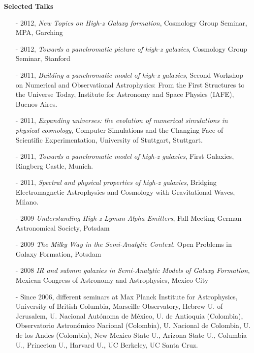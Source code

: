 \documentclass[9pt]{article}
\begin{document}
{\bf Selected Talks}
\begin{itemize} 
\item [-] 2012, {\it New Topics on High-z Galaxy formation}, Cosmology Group Seminar, MPA, Garching
\item [-] 2012, {\it Towards a panchromatic picture of high-z galaxies}, Cosmology Group Seminar, Stanford
\item [-] 2011, {\it Building a panchromatic model of high-z galaxies}, Second Workshop on Numerical and Observational Astrophysics: From the First Structures to the Universe Today, Institute for Astronomy and Space Physics (IAFE), Buenos Aires.
\item [-] 2011, {\it Expanding universes: the evolution of numerical simulations in physical cosmology}, Computer Simulations and the Changing Face of Scientific Experimentation, University of Stuttgart, Stuttgart.
\item [-] 2011, {\it Towards a panchromatic model of high-z galaxies}, First
  Galaxies, Ringberg Castle, Munich. 
\item [-] 2011, {\it Spectral and physical properties of high-z galaxies},
  Bridging Electromagnetic Astrophysics and Cosmology with Gravitational
  Waves, Milano.
\item [-] 2009 {\it Understanding High-z Lyman Alpha Emitters}, Fall Meeting German Astronomical Society, Potsdam
\item [-] 2009 {\it The Milky Way in the Semi-Analytic Context}, Open Problems in Galaxy Formation, Potsdam
\item [-] 2008 {\it IR and submm galaxies in Semi-Analytic Models of Galaxy Formation}, Mexican Congress of Astronomy and Astrophysics, Mexico City
\item [-] Since 2006, different seminars at Max Planck Institute for Astrophysics, University of British Columbia, Marseille Observatory, Hebrew U. of Jerusalem, U. Nacional Aut\'onoma de M\'exico, U. de Antioquia (Colombia), Observatorio Astron\'omico Nacional (Colombia), U. Nacional de Colombia, U. de los Andes (Colombia), New Mexico State U., Arizona State U., Columbia U., Princeton U., Harvard U., UC Berkeley, UC Santa Cruz.
\end{itemize}
\end{document}
